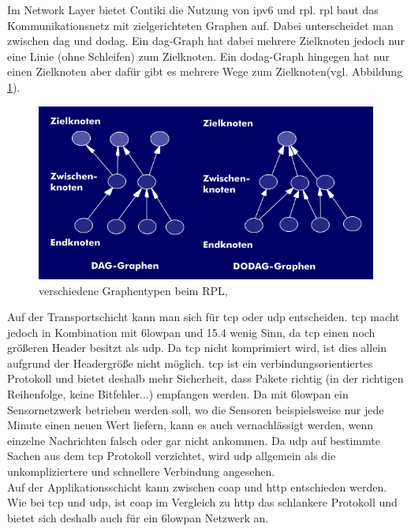 	Im Network Layer bietet Contiki die Nutzung von \ac{ipv6} und \ac{rpl}. \ac{rpl} baut das Kommunikationsnetz mit zielgerichteten Graphen auf. Dabei unterscheidet man zwischen \ac{dag} und \ac{dodag}. Ein \ac{dag}-Graph hat dabei mehrere Zielknoten jedoch nur eine Linie (ohne Schleifen) zum Zielknoten. Ein \ac{dodag}-Graph hingegen hat nur einen Zielknoten aber dafür gibt es mehrere Wege zum Zielknoten(vgl. Abbildung \ref{RPL_DAG_DODAG}).\\
	\begin{figure}
		\centering
		\includegraphics[scale=0.5]{Grafiken-Julian/RPL_DAG_DODAG.png}
		\caption{verschiedene Graphentypen beim RPL, \cite{rpldagdodag}}
		\label{RPL_DAG_DODAG}
	\end{figure}
	Auf der Transportschicht kann man sich für \ac{tcp} oder \ac{udp} entscheiden. \ac{tcp} macht jedoch in Kombination mit \ac{6lowpan} und \ac{15.4} wenig Sinn, da \ac{tcp} einen noch größeren Header besitzt als \ac{udp}. Da \ac{tcp} nicht komprimiert wird, ist dies allein aufgrund der Headergröße nicht möglich. \ac{tcp} ist ein verbindungsorientiertes Protokoll und bietet deshalb mehr Sicherheit, dass Pakete richtig (in der richtigen Reihenfolge, keine Bitfehler...) empfangen werden. Da mit \ac{6lowpan} ein Sensornetzwerk betrieben werden soll, wo die Sensoren beispielsweise nur jede Minute einen neuen Wert liefern, kann es auch vernachlässigt werden, wenn einzelne Nachrichten falsch oder gar nicht ankommen. Da \ac{udp} auf bestimmte Sachen aus dem \ac{tcp} Protokoll verzichtet, wird \ac{udp} allgemein als die unkompliziertere und schnellere Verbindung angesehen.\\
	Auf der Applikationsschicht kann zwischen \ac{coap} und \ac{http} entschieden werden. Wie bei \ac{tcp} und \ac{udp}, ist \ac{coap} im Vergleich zu \ac{http} das schlankere Protokoll und bietet sich deshalb auch für ein \ac{6lowpan} Netzwerk an.\\
	
